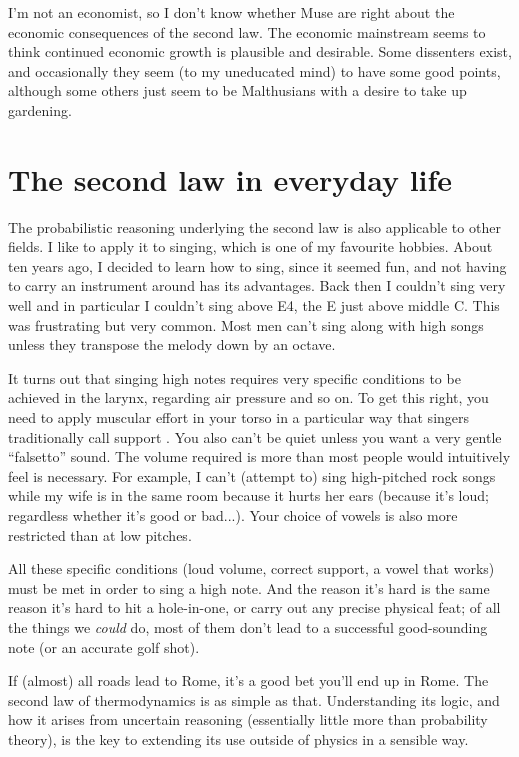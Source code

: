 \documentclass[a4paper, 12pt]{article}
\begin{document}
I'm not an economist, so I don't know whether Muse are right about the economic
consequences of the second law. The economic mainstream seems to think
continued economic growth is plausible and desirable. Some dissenters exist,
and occasionally they seem (to my uneducated mind) to have some good points,
although some others just seem to be Malthusians with a desire to
take up gardening.

\section*{The second law in everyday life}
The probabilistic reasoning underlying the second law is
also applicable to other fields. I like to apply it to singing, which
is one of my favourite hobbies. About ten years ago, I decided to
learn how to sing, since it seemed fun, and not having to carry an instrument
around has its advantages. Back then I couldn't sing very well and in particular
I couldn't sing above E4, the E just above middle C. This was frustrating but
very common. Most men can't sing along with high songs
unless they transpose the melody down by an octave.

It turns out that singing high notes requires very specific conditions to be
achieved in the larynx, regarding air pressure and so on. To get this right,
you need to apply muscular effort in your torso in a particular way that singers
traditionally call support \citep{cvt}. You also can't be quiet unless you want
a very gentle ``falsetto'' sound. The volume required is more than most people
would intuitively feel is necessary. For example, I can't (attempt to)
sing high-pitched
rock songs while my wife is in the same room because it hurts her ears
(because it's loud; regardless whether it's good or bad...). Your choice of vowels is also more restricted than at low pitches.

All these specific conditions (loud volume, correct support, a vowel that works)
must be met in order to sing a high note. And
the reason it's hard is the same reason it's hard to hit a hole-in-one, or
carry out any precise physical feat; of all the things we {\em could} do,
most of them don't lead to a successful good-sounding note (or an accurate
golf shot).

If (almost) all roads lead to Rome, it's a good bet you'll end up in Rome.
The second law of thermodynamics is as simple as that. Understanding its logic,
and how it arises from uncertain reasoning (essentially little
more than probability theory),
is the key to extending its use outside of physics in a sensible way.
\end{document}
